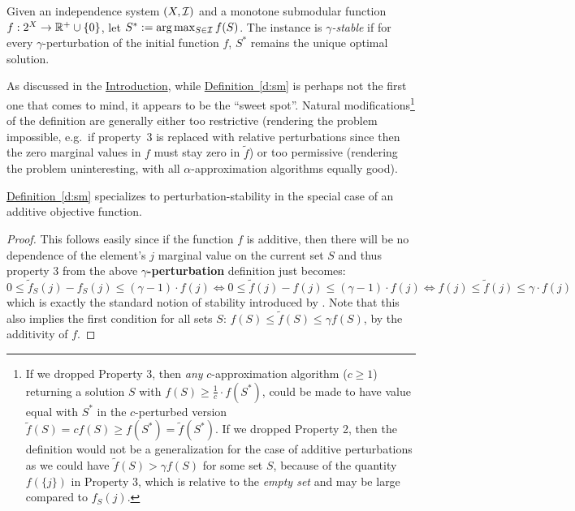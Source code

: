 \begin{definition} \label{d:sm2}
  Given an independence system $(X,\mathcal{I})$ and a monotone submodular
  function $f: 2^X\rightarrow \mathbb{R}^+\cup \{0\}$, let $S^*:=\arg\max_{S\in \mathcal{I}}f(S)$. The instance is
  {\em $\gamma$-stable} if
  for every $\gamma$-perturbation of the initial function $f$, $S^*$
  remains the unique optimal solution.
\end{definition}
As discussed in the \hyperref[sec:introduction]{Introduction}, 
while \hyperref[d:sm]{Definition~\ref{d:sm}} is perhaps not the first one that comes to
mind, it appears to be the ``sweet spot''.  Natural modifications\footnote{If we dropped Property 3, then \textit{any} $c$-approximation algorithm ($c\ge1$) returning a solution $S$ with $f(S)\ge\tfrac{1}{c}\cdot f(S^*)$, could be made to have value equal with $S^*$ in the $c$-perturbed version $\tilde{f}(S)=cf(S)\ge f(S^*)=\tilde{f}(S^*)$. If we dropped Property 2, then the definition would not be a generalization for the case of additive perturbations as we could have $\tilde{f}(S)> \gamma f(S)$ for some set $S$, because of the quantity $f(\{j\})$ in Property 3, which is relative to the \textit{empty set} and may be large compared to $f_S(j)$.} of
the definition are generally either too restrictive (rendering the
problem impossible, e.g.~if property~3 is replaced with relative
perturbations since then the zero marginal values in $f$ must stay zero in $\tilde{f}$) or too permissive (rendering the problem uninteresting,
with all $\alpha$-approximation algorithms equally good).

\begin{proposition}
  \hyperref[d:sm]{Definition~\ref{d:sm}} specializes to perturbation-stability in the
  special case of an additive objective function.
\end{proposition}
\begin{proof}
This follows easily since if the function $f$ is additive, then there will be no dependence of the element's $j$ marginal value on the current set $S$ and thus property 3 from the above $\gamma$\textbf{-perturbation} definition just becomes:
$$
0 \le \tilde{f}_S(j) - f_S(j) \le (\gamma -1)\cdot f(j) \iff 0\le \tilde{f}(j)-f(j) \le  (\gamma -1)\cdot f(j) \iff f(j)\le  \tilde{f}(j) \le \gamma \cdot f(j)
$$
which is exactly the standard notion of stability introduced by \cite{bilu2012stable}. Note that this also implies the first condition for all sets $S$: $f(S) \le \tilde{f}(S)\le \gamma f(S)$, by the additivity of $f$.
\end{proof}

